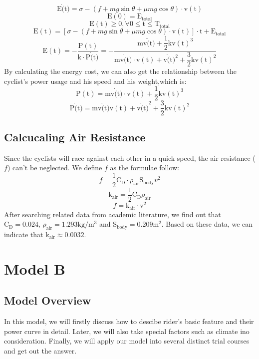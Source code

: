 \documentclass[14pt]{article}
\begin{document}
	$$\mathrm{E}\dot(\mathrm{t})=\sigma-\left(f+mg\sin\theta+\mu mg\cos \theta\right)\cdot \mathrm{v}
	(\mathrm{t})$$
	$$\mathrm{E}(0)=\mathrm{E}_\mathrm{total}$$
	$$\mathrm{E}(\mathrm{t})\geq0, \forall 0 \leq \mathrm{t} \leq \mathrm{T}_\mathrm{total}$$
	$$\mathrm{E}(\mathrm{t})=\left[\sigma-\left(f+mg\sin \theta +\mu mg \cos \theta \right)\cdot \mathrm{v}(\mathrm{t})\right]\cdot \mathrm{t}+\mathrm{E}_\mathrm{total}$$
	$$\mathrm{E}(\mathrm{t})=-\dfrac{\mathrm{P}(\mathrm{t})}{\mathrm{k}\cdot \mathrm{P}\dot(\mathrm{t})}=-\dfrac{\mathrm{m}\mathrm{v}\ddot(\mathrm{t})+\dfrac{1}{2}\mathrm{k}{\mathrm{v}(\mathrm{t})}^3}{\mathrm{m}\mathrm{v}\dot(\mathrm{t})\cdot\mathrm{v}(\mathrm{t})+\mathrm{v}\dot(\mathrm{t})^2+\dfrac{3}{2}\mathrm{k}{\mathrm{v}(\mathrm{t})}^2}$$
	By calculating the energy cost, we can also get the relationship between the cyclist's power usage and his speed and his weight,which is:
	$$\mathrm{P}(\mathrm{t})=\mathrm{m}\mathrm{v}\dot(\mathrm{t})\cdot \mathrm{v}(\mathrm{t})+\dfrac{1}{2}\mathrm{k}{\mathrm{v}(\mathrm{t})}^3$$
	$$\mathrm{P}\dot(\mathrm{t})=\mathrm{m}\mathrm{v}\ddot(\mathrm{t})\mathrm{v}(\mathrm{t})+{\mathrm{v}\dot(\mathrm{t})}^2+\dfrac{3}{2}\mathrm{k}{\mathrm{v}(\mathrm{t})}^2$$
	\subsection{Calcucaling Air Resistance}
	Since the cyclists will race against each other in a quick speed, the air resistance ($f$) can't be neglected. We define $f$ as the formulae follow:
	$$f=\dfrac{1}{2} \mathrm{C}_\mathrm{D} \cdot \rho_\mathrm{air} \mathrm{S}_\mathrm{body} v^2$$
	$$\mathrm{k}_\mathrm{air}=\dfrac{1}{2} \mathrm{C}_\mathrm{D} \rho_\mathrm{air}$$
	$$f=\mathrm{k}_\mathrm{air}\cdot \mathrm{v}^2$$
	After searching related data from academic literature, we find out that $\mathrm{C}_\mathrm{D}=0.024$, $\rho_\mathrm{air}=1.293 \mathrm{kg/}\mathrm{m}^3$ and $\mathrm{S}_\mathrm{body}=0.209 \mathrm{m}^2$. Based on these data, we can indicate that $\mathrm{k}_\mathrm{air}\approx0.0032$.
	\section{Model B}
	\subsection{Model Overview}
	In this model, we will firstly discuss how to descibe rider's basic feature and their power curve in detail. Later, we will also take special factors such as climate ino consideration. Finally, we will apply our model into several distinct trial courses and get out the answer.
\end{document}
